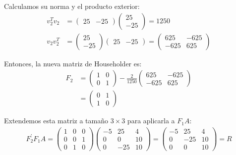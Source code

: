 \begin{homeworkProblem}
\begin{itemize}
\begin{solucion}
    Calculamos su norma y el producto exterior:
    \begin{align*}
        v_2^{T} v_2 &= \begin{pmatrix} 25 & -25 \end{pmatrix}
        \begin{pmatrix} 25\\ -25 \end{pmatrix} = 1250\\
        v_2 v_2^{T} &= \begin{pmatrix} 25\\ -25 \end{pmatrix}
        \begin{pmatrix} 25 & -25 \end{pmatrix} =
        \begin{pmatrix}
            625 & -625 \\
            -625 & 625
        \end{pmatrix}
    \end{align*}

    Entonces, la nueva matriz de Householder es:
    \begin{align*}
        F_2 &= \begin{pmatrix} 1 & 0 \\ 0 & 1 \end{pmatrix}
        - \frac{2}{1250}
        \begin{pmatrix}
            625 & -625 \\
            -625 & 625
        \end{pmatrix} \\
        &= \begin{pmatrix}
            0 & 1\\
            1 & 0
        \end{pmatrix}
    \end{align*}

    Extendemos esta matriz a tamaño $3\times3$ para aplicarla a $F_1 A$:
    \begin{align*}
        F_2^{'} F_1 A =
        \begin{pmatrix}
            1 & 0 & 0\\
            0 & 0 & 1\\
            0 & 1 & 0
        \end{pmatrix}
        \begin{pmatrix}
            -5 & 25 & 4\\
            0 & 0 & 10\\
            0 & -25 & 10
        \end{pmatrix}
        =
        \begin{pmatrix}
            -5 & 25 & 4\\
            0 & -25 & 10\\
            0 & 0 & 10
        \end{pmatrix} = R
    \end{align*}


\end{solucion}
\end{itemize}
\end{homeworkProblem}
